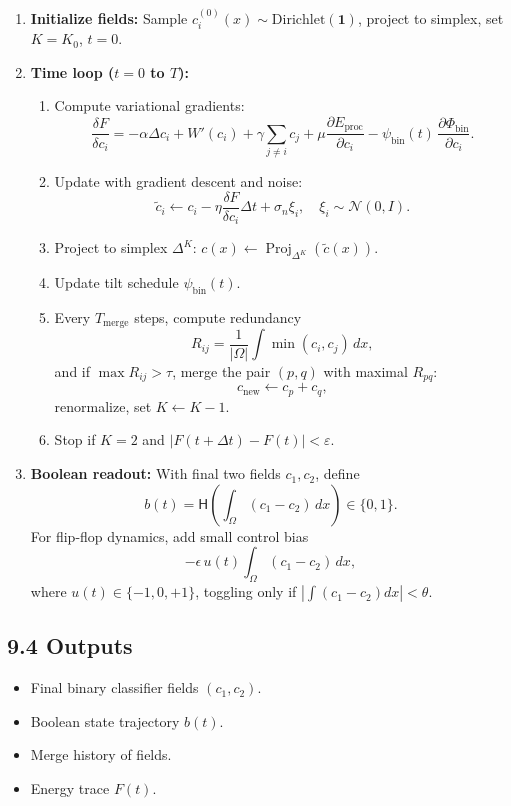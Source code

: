 \documentclass[11pt]{article}
\theoremstyle{plain}
\begin{document}
\begin{enumerate}[noitemsep]
    \item \textbf{Initialize fields:} 
    Sample $c_i^{(0)}(x) \sim \text{Dirichlet}(\mathbf{1})$, project to simplex, set $K=K_0$, $t=0$.
    
    \item \textbf{Time loop ($t=0$ to $T$):}
    \begin{enumerate}[noitemsep]
        \item Compute variational gradients:
        \[
        \frac{\delta F}{\delta c_i} = -\alpha \Delta c_i + W'(c_i) + \gamma \!\!\sum_{j\neq i} c_j + \mu \frac{\partial E_{\text{proc}}}{\partial c_i} - \psi_{\text{bin}}(t)\, \frac{\partial \Phi_{\text{bin}}}{\partial c_i}.
        \]
        \item Update with gradient descent and noise:
        \[
        \tilde c_i \leftarrow c_i - \eta \frac{\delta F}{\delta c_i} \Delta t + \sigma_n \xi_i, \quad \xi_i \sim \mathcal{N}(0,I).
        \]
        \item Project to simplex $\Delta^K$: $c(x) \leftarrow \operatorname{Proj}_{\Delta^K}(\tilde c(x))$.
        \item Update tilt schedule $\psi_{\text{bin}}(t)$.
        \item Every $T_{\text{merge}}$ steps, compute redundancy
        \[
        R_{ij} = \frac{1}{|\Omega|}\int \min(c_i,c_j)\,dx,
        \]
        and if $\max R_{ij} > \tau$, merge the pair $(p,q)$ with maximal $R_{pq}$:
        \[
        c_{\text{new}} \leftarrow c_p + c_q,
        \]
        renormalize, set $K \leftarrow K-1$.
        \item Stop if $K=2$ and $|F(t+\Delta t)-F(t)|<\varepsilon$.
    \end{enumerate}
    
    \item \textbf{Boolean readout:}
    With final two fields $c_1,c_2$, define
    \[
    b(t) = \mathsf{H}\!\left(\int_\Omega (c_1-c_2)\,dx\right) \in \{0,1\}.
    \]
    For flip-flop dynamics, add small control bias
    \[
    -\epsilon\,u(t)\int_\Omega (c_1-c_2)\,dx,
    \]
    where $u(t) \in \{-1,0,+1\}$, toggling only if $|\int (c_1-c_2) dx|<\theta$.
\end{enumerate}

\subsection*{9.4 Outputs}

\begin{itemize}[noitemsep]
    \item Final binary classifier fields $(c_1,c_2)$.
    \item Boolean state trajectory $b(t)$.
    \item Merge history of fields.
    \item Energy trace $F(t)$.
\end{itemize}
\end{document}
